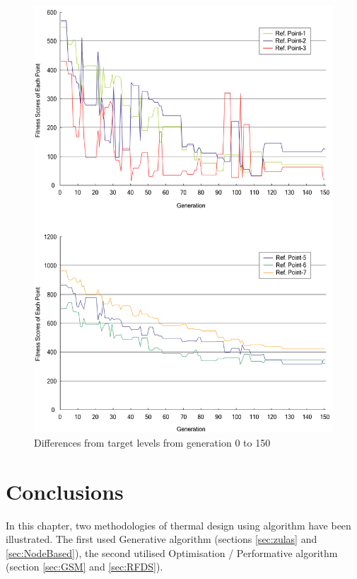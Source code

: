 \begin{figure}[h]
\centering
\includegraphics[width=\textwidth]{./Images/30-RFDSdiff}
\caption[RFDS Target Level Differences]{Differences from target levels from generation 0 to 150 \cite{kawakita01}}
\label{fig:RFDSdiff}
\end{figure}

\clearpage
\section{Conclusions}

In this chapter, two methodologies of thermal design using algorithm have been illustrated. The first used Generative algorithm (sections \ref{sec:zulas} and \ref{sec:NodeBased}), the second utilised Optimisation / Performative algorithm (section \ref{sec:GSM} and \ref{sec:RFDS}).

